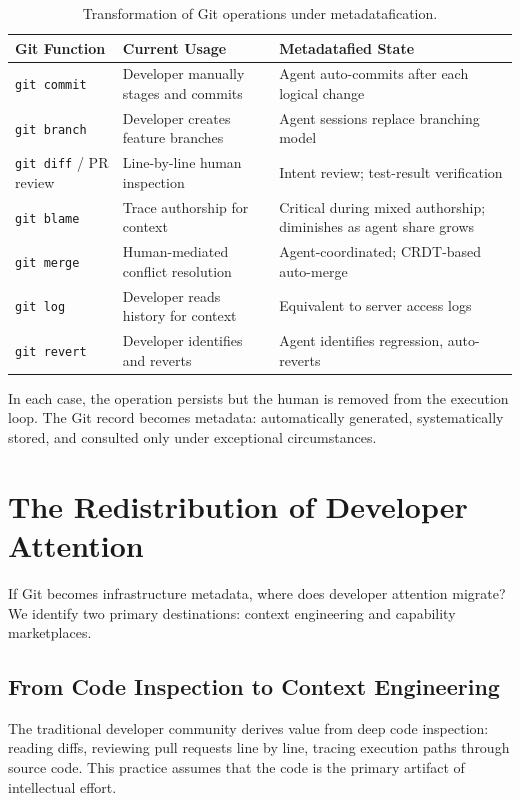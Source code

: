 \documentclass[12pt]{article}
\begin{document}
\begin{table}[h]
\centering
\small
\begin{tabularx}{\textwidth}{lXX}
\toprule
\textbf{Git Function} & \textbf{Current Usage} & \textbf{Metadatafied State} \\
\midrule
\texttt{git commit} & Developer manually stages and commits & Agent auto-commits after each logical change \\
\texttt{git branch} & Developer creates feature branches & Agent sessions replace branching model \\
\texttt{git diff} / PR review & Line-by-line human inspection & Intent review; test-result verification \\
\texttt{git blame} & Trace authorship for context & Critical during mixed authorship; diminishes as agent share grows \\
\texttt{git merge} & Human-mediated conflict resolution & Agent-coordinated; CRDT-based auto-merge \\
\texttt{git log} & Developer reads history for context & Equivalent to server access logs \\
\texttt{git revert} & Developer identifies and reverts & Agent identifies regression, auto-reverts \\
\bottomrule
\end{tabularx}
\caption{Transformation of Git operations under metadatafication.}
\label{tab:git-functions}
\end{table}

In each case, the operation persists but the human is removed from the execution loop. The Git record becomes metadata: automatically generated, systematically stored, and consulted only under exceptional circumstances.

\section{The Redistribution of Developer Attention}

If Git becomes infrastructure metadata, where does developer attention migrate? We identify two primary destinations: context engineering and capability marketplaces.

\subsection{From Code Inspection to Context Engineering}

The traditional developer community derives value from deep code inspection: reading diffs, reviewing pull requests line by line, tracing execution paths through source code. This practice assumes that the code is the primary artifact of intellectual effort.
\end{document}
